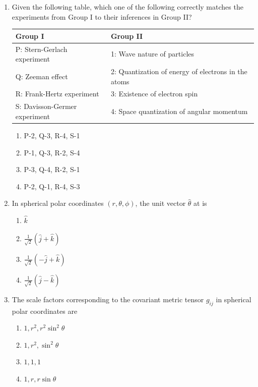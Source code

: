 \documentclass[journal,12pt,onecolumn]{IEEEtran}
\theoremstyle{remark}
\begin{document}
\begin{enumerate}
    \item Given the following table, which one of the following correctly matches the experiments from Group I to their inferences in Group II?
    \begin{center}
    \begin{tabular}{|l|l|}
        \hline
        \textbf{Group I} & \textbf{Group II} \\
        \hline
        P: Stern-Gerlach experiment & 1: Wave nature of particles \\
        \hline
        Q: Zeeman effect & 2: Quantization of energy of electrons in the atoms \\
        \hline
        R: Frank-Hertz experiment & 3: Existence of electron spin \\
        \hline
        S: Davisson-Germer experiment & 4: Space quantization of angular momentum \\
        \hline
    \end{tabular}
    \end{center}
    \hfill{} \begin{enumerate}
        \item P-2, Q-3, R-4, S-1
        \item P-1, Q-3, R-2, S-4
        \item P-3, Q-4, R-2, S-1
        \item P-2, Q-1, R-4, S-3
    \end{enumerate}

    \item In spherical polar coordinates $(r, \theta, \phi)$, the unit vector $\hat{\theta}$ at  is
    \hfill{} \begin{enumerate}
        \item $\hat{k}$
        \item $\frac{1}{\sqrt{2}}(\hat{j}+\hat{k})$
        \item $\frac{1}{\sqrt{2}}(-\hat{j}+\hat{k})$
        \item $\frac{1}{\sqrt{2}}(\hat{j}-\hat{k})$
    \end{enumerate}

    \item The scale factors corresponding to the covariant metric tensor $g_{ij}$ in spherical polar coordinates are
    \hfill{} \begin{enumerate}
        \item $1, r^2, r^2 \sin^2\theta$
        \item $1, r^2, \sin^2\theta$
        \item $1, 1, 1$
        \item $1, r, r \sin\theta$
    \end{enumerate}


\end{enumerate}
\end{document}
